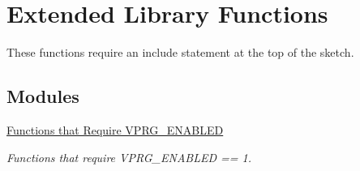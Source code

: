 \hypertarget{group__ExtendedFunctions}{}\section{Extended Library Functions}
\label{group__ExtendedFunctions}


These functions require an include statement at the top of the sketch.  


\subsection*{Modules}
\begin{DoxyCompactItemize}
\item 
\hyperlink{group__ReqVPRG__ENABLED}{Functions that Require V\+P\+R\+G\+\_\+\+E\+N\+A\+B\+L\+ED}
\begin{DoxyCompactList}\small\item\em Functions that require V\+P\+R\+G\+\_\+\+E\+N\+A\+B\+L\+ED == 1. \end{DoxyCompactList}\end{DoxyCompactItemize}
